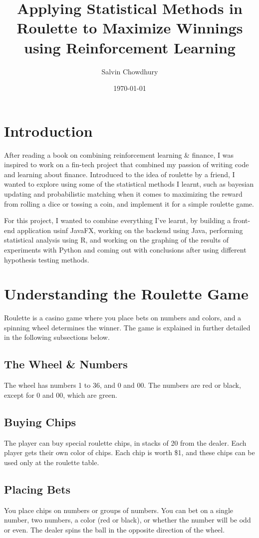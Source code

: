 \documentclass[a4paper]{article}
\title{Applying Statistical Methods in Roulette to Maximize Winnings using Reinforcement Learning}
\author{Salvin Chowdhury}
\date{\today}
\begin{document}
\maketitle

\section{Introduction}
After reading a book on combining reinforcement learning \& finance, I was inspired to work on a fin-tech project
that combined my passion of writing code and learning about finance. Introduced to the idea of roulette by a friend,
I wanted to explore using some of the statistical methods I learnt, such as bayesian updating and probabilistic 
matching when it comes to maximizing the reward from rolling a dice or tossing a coin, and implement it for a 
simple roulette game.

For this project, I wanted to combine everything I've learnt, by building a front-end application usinf JavaFX,
working on the backend using Java, performing statistical analysis using R, and working on the graphing of the 
results of experiments with Python and coming out with conclusions after using different hypothesis testing methods.

\section{Understanding the Roulette Game}
Roulette is a casino game where you place bets on numbers and colors, and a spinning wheel determines the winner. 
The game is explained in further detailed in the following subsections below.

\subsection{The Wheel \& Numbers}
The wheel has numbers 1 to 36, and 0 and 00. The numbers are red or black, except for 0 and 00, which are green.

\subsection{Buying Chips}
The player can buy special roulette chips, in stacks of 20 from the dealer. Each player gets their own color of 
chips. Each chip is worth \$1, and these chips can be used only at the roulette table.

\subsection{Placing Bets}
You place chips on numbers or groups of numbers. You can bet on a single number, two numbers, a color (red or black),
or whether the number will be odd or even. The dealer spins the ball in the opposite direction of the wheel.
\end{document}
